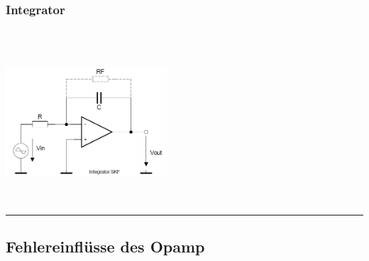 		\subsubsection{Integrator } 
		\vspace{1cm}
		\begin{minipage}[b]{12cm}
		\hspace{8mm} \\
		\hspace{8mm} \\
		\end{minipage} 
		\begin{minipage}{6cm}
          	\includegraphics[width=6cm]{./bilder/integrator.png} 
        \end{minipage}\\
		
\hrule
		\subsection{Fehlereinflüsse des Opamp }
